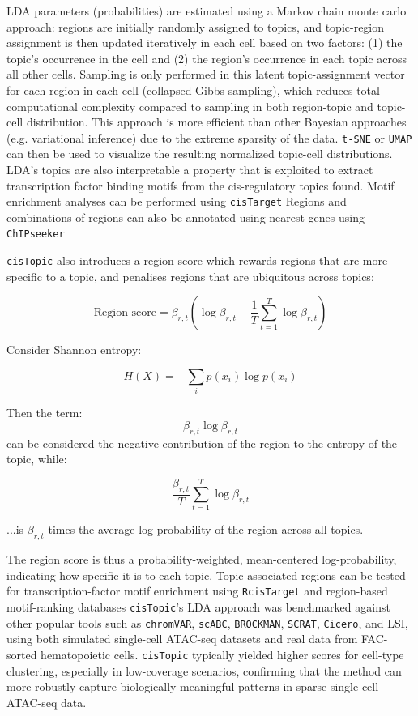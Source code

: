 LDA parameters (probabilities) are estimated using a Markov chain monte carlo approach: regions are initially randomly assigned to topics, and topic-region assignment is then updated iteratively in each cell based on two factors: (1) the topic's occurrence in the cell and (2) the region's occurrence in each topic across all other cells. Sampling is only performed in this latent topic-assignment vector for each region in each cell (collapsed Gibbs sampling), which reduces total computational complexity compared to sampling in both region-topic and topic-cell distribution. This approach is more efficient than other Bayesian approaches (e.g. variational inference) due to the extreme sparsity of the data. \verb|t-SNE| or \verb|UMAP| can then be used to visualize the resulting normalized topic-cell distributions. LDA's topics are also interpretable a property that is exploited to extract transcription factor binding motifs from the cis-regulatory topics found. Motif enrichment analyses can be performed using \verb|cisTarget| Regions and combinations of regions can also be annotated using nearest genes using \verb|ChIPseeker|

\verb|cisTopic| also introduces a region score which rewards regions that are more specific to a topic, and penalises regions that are ubiquitous across topics:

\[
	\text{Region score} = \beta_{r,t} \left( \log \beta_{r,t} - \frac{1}{T} \sum_{t=1}^{T} \log \beta_{r,t} \right)
\]

\begin{center}
	Consider Shannon entropy:

	\[H(X) = -\sum_{i} p(x_i) \log p(x_i)\]

	Then the term: \[\beta_{r,t} \log \beta_{r,t}\] can be considered the negative contribution of the region to the entropy of the topic, while:

	\[\frac{\beta_{r,t}}{T} \sum_{t=1}^{T} \log \beta_{r,t}\]

	...is $\beta_{r,t}$ times the average log-probability of the region across all topics.
\end{center}

The region score is thus a probability-weighted, mean-centered log-probability, indicating how specific it is to each topic. Topic-associated regions can be tested for transcription-factor motif enrichment using \verb|RcisTarget| and region-based motif-ranking databases \verb|cisTopic|'s LDA approach was benchmarked against other popular tools such as \verb|chromVAR|, \verb|scABC|, \verb|BROCKMAN|, \verb|SCRAT|, \verb|Cicero|, and LSI, using both simulated single-cell ATAC-seq datasets and real data from FAC-sorted hematopoietic cells. \verb|cisTopic| typically yielded higher scores for cell-type clustering, especially in low-coverage scenarios, confirming that the method can more robustly capture biologically meaningful patterns in sparse single-cell ATAC-seq data.

